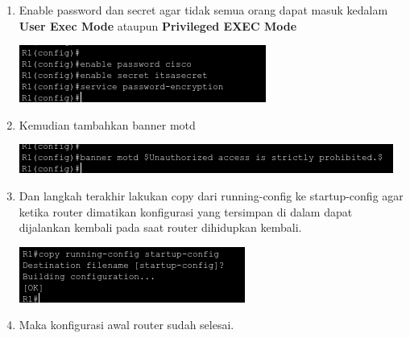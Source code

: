 \documentclass{article}
\begin{document}
\begin{flushleft}
\begin{enumerate}
            \item Enable password dan secret agar tidak semua orang dapat masuk kedalam \textbf{User Exec Mode} ataupun \textbf{Privileged EXEC Mode}
            
            \includegraphics[]{2-7.png}

            \item Kemudian tambahkan banner motd

            \includegraphics[scale=0.9]{2-8.png}

            \item Dan langkah terakhir lakukan copy dari running-config ke startup-config agar ketika router dimatikan konfigurasi yang tersimpan di dalam dapat dijalankan kembali pada saat router dihidupkan kembali.
            
            \includegraphics[]{2-9.png}

            \item Maka konfigurasi awal router sudah selesai.
        \end{enumerate}
    \end{flushleft}
\end{document}

